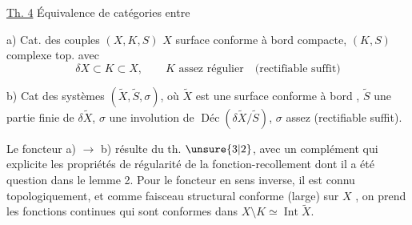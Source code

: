 \uline{Th. 4} Équivalence de catégories entre

a) Cat. des couples $(X,K,S)$ $X$ surface conforme
à bord compacte, $(K,S)$ complexe top.  avec
\[
\delta X\subset K\subset X,\qquad K\text{ assez régulier}\quad\text{(rectifiable suffit)}
\]


b) Cat des systèmes $(\widetilde X,\widetilde S,\sigma)$, où
$\widetilde X$ est une surface conforme à bord ,
$\widetilde S$ une partie finie de $\delta\widetilde X$, $\sigma$ une
involution de $\operatorname{\text{Déc}}(\delta\widetilde X/\widetilde S)$, $\sigma$ assez
 (rectifiable suffit).

Le foncteur a) $\longrightarrow$ b) résulte du th. $\unsure{3|2}$,
avec un complément qui explicite les
propriétés de régularité de la fonction-recollement
dont il a été question dans
le lemme 2. Pour le foncteur en sens
inverse, il est connu topologiquement, et
comme faisceau structural conforme
(large) sur $X$ , on prend les fonctions
continues qui sont conformes dans $X\setminus K\simeq\operatorname{Int}\widetilde X$.
